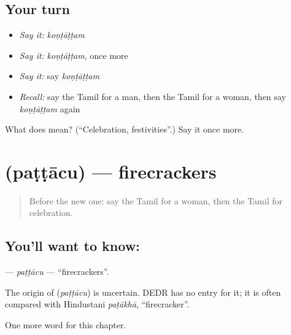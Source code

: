 \subsection*{Your turn}
\begin{itemize}
\raggedright
  \item \emph{Say it:} \emph{koṇṭāṭṭam}
  \item \emph{Say it:} \emph{koṇṭāṭṭam}, once more
  \item \emph{Say it:} say \emph{koṇṭāṭṭam}
  \item \emph{Recall:} say the Tamil for a man, then the Tamil for a woman, then say \emph{koṇṭāṭṭam} again
\end{itemize}

\begin{tcolorbox}[breakable,colback=teal!4,colframe=teal!35!black,title={Before you move on}]
What does  mean? (\textquotedblleft{}Celebration, festivities\textquotedblright{}.) Say it once more.
\end{tcolorbox}
\section[\texorpdfstring{\ta{பட்டாசு} (paṭṭācu)}{பட்டாசு (paṭṭācu)}]{ (paṭṭācu) — firecrackers}

\label{lesson:TA-C246-pattacu}



\begin{quote}
Before the new one: say the Tamil for a woman, then the Tamil for celebration.
\end{quote}

\subsection*{You'll want to know: }
\textbf{} — \emph{paṭṭācu} — \textquotedblleft{}firecrackers\textquotedblright{}.

\begin{cousinweb}
The origin of \textbf{} (\emph{paṭṭācu}) is uncertain. DEDR has no entry for it; it is often compared with Hindustani \emph{paṭākhā}, \textquotedblleft{}firecracker\textquotedblright{}.
\end{cousinweb}

\begin{grammarlens}[title={What you've built}]
One more word for this chapter.
\end{grammarlens}

